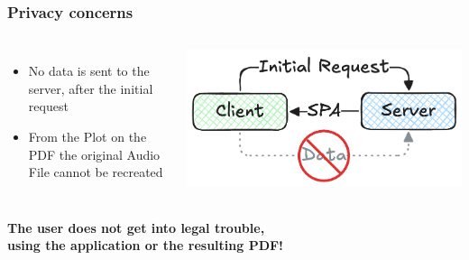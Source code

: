 \begin{frame}
    \frametitle{Privacy concerns}
    \begin{columns}
        \begin{itemize}
            \large
            \item No data is sent to the server, after the initial request
            \item From the Plot on the PDF the original Audio File cannot be recreated
        \end{itemize}
        \centering
        \includegraphics[width=1\linewidth]{../assets/privacy_illustrated.png}
    \end{columns}
    \hfill \break
    \hfill \break
    \textbf{
        The user does not get into legal trouble, \\
        using the application or the resulting PDF!
    }
\end{frame}

